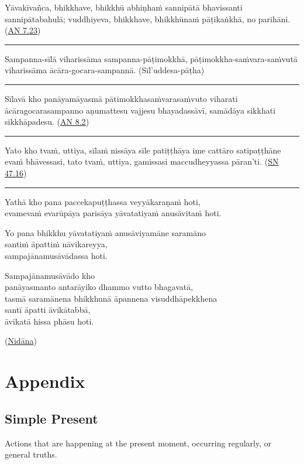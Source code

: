 \documentclass[11pt,oneside]{memoir}
\begin{document}
Yāvakīvañca, bhikkhave, bhikkhū abhiṇhaṁ sannipātā bhavissanti sannipātabahulā;
vuddhiyeva, bhikkhave, bhikkhūnaṁ pāṭikaṅkhā, no parihāni. (\href{https://suttacentral.net/an7.23/pli/ms}{AN 7.23})

\noindent\rule{\textwidth}{0.5pt}

Sampanna-sīlā viharissāma sampanna-pāṭimokkhā, pāṭimokkha-saṁvara-saṁvutā
viharissāma ācāra-gocara-sampannā. (Sīl'uddesa-pāṭha)

\noindent\rule{\textwidth}{0.5pt}

Sīlavā kho panāyamāyasmā pātimokkhasaṁvarasaṁvuto viharati ācāragocarasampanno
aṇumattesu vajjesu bhayadassāvī, samādāya sikkhati sikkhāpadesu. (\href{https://suttacentral.net/an8.2/pli/ms}{AN 8.2})

\noindent\rule{\textwidth}{0.5pt}

Yato kho tvaṁ, uttiya, sīlaṁ nissāya sīle patiṭṭhāya ime cattāro satipaṭṭhāne
evaṁ bhāvessasi, tato tvaṁ, uttiya, gamissasi maccudheyyassa pāran'ti. (\href{https://suttacentral.net/sn47.16/pli/ms}{SN 47.16})

\noindent\rule{\textwidth}{0.5pt}

Yathā kho pana paccekapuṭṭhassa veyyākaraṇaṁ hoti, \\
evamevaṁ evarūpāya parisāya yāvatatiyaṁ anusāvitaṁ hoti.

Yo pana bhikkhu yāvatatiyaṁ anusāviyamāne saramāno \\
santiṁ āpattiṁ nāvikareyya, \\
sampajānamusāvādassa hoti.

Sampajānamusāvādo kho \\
panāyasmanto antarāyiko dhammo vutto bhagavatā, \\
tasmā saramānena bhikkhunā āpannena visuddhāpekkhena \\
santī āpatti āvikātabbā, \\
āvikatā hissa phāsu hoti.

(\href{https://suttacentral.net/pli-tv-bu-pm/pli/ms}{Nidāna})
\chapter{Appendix}
\label{sec:org238d5ef}
\section{Simple Present}
\label{sec:org5c9544a}

Actions that are happening at the present moment, occurring regularly, or general truths.
\end{document}
